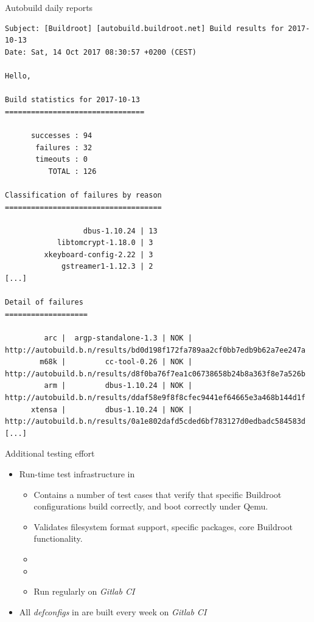 \begin{frame}[fragile]{Autobuild daily reports}

{\tiny
\begin{verbatim}
Subject: [Buildroot] [autobuild.buildroot.net] Build results for 2017-10-13
Date: Sat, 14 Oct 2017 08:30:57 +0200 (CEST)

Hello,

Build statistics for 2017-10-13
================================

      successes : 94 
       failures : 32 
       timeouts : 0  
          TOTAL : 126

Classification of failures by reason
====================================

                  dbus-1.10.24 | 13
            libtomcrypt-1.18.0 | 3 
         xkeyboard-config-2.22 | 3 
             gstreamer1-1.12.3 | 2 
[...]

Detail of failures
===================

         arc |  argp-standalone-1.3 | NOK | http://autobuild.b.n/results/bd0d198f172fa789aa2cf0bb7edb9b62a7ee247a
        m68k |         cc-tool-0.26 | NOK | http://autobuild.b.n/results/d8f0ba76f7ea1c06738658b24b8a363f8e7a526b
         arm |         dbus-1.10.24 | NOK | http://autobuild.b.n/results/ddaf58e9f8f8cfec9441ef64665e3a468b144d1f
      xtensa |         dbus-1.10.24 | NOK | http://autobuild.b.n/results/0a1e802dafd5cded6bf783127d0edbadc584583d
[...]
\end{verbatim}}

\end{frame}

\begin{frame}{Additional testing effort}
  \begin{itemize}
  \item Run-time test infrastructure in 
    \begin{itemize}
    \item Contains a number of test cases that verify that specific
      Buildroot configurations build correctly, and boot correctly
      under Qemu.
    \item Validates filesystem format support, specific packages, core
      Buildroot functionality.
    \item {}
    \item {}
    \item Run regularly on {\em Gitlab CI}
    \end{itemize}
  \item All {\em defconfigs} in  are built every week
    on {\em Gitlab CI}
  \end{itemize}
\end{frame}
